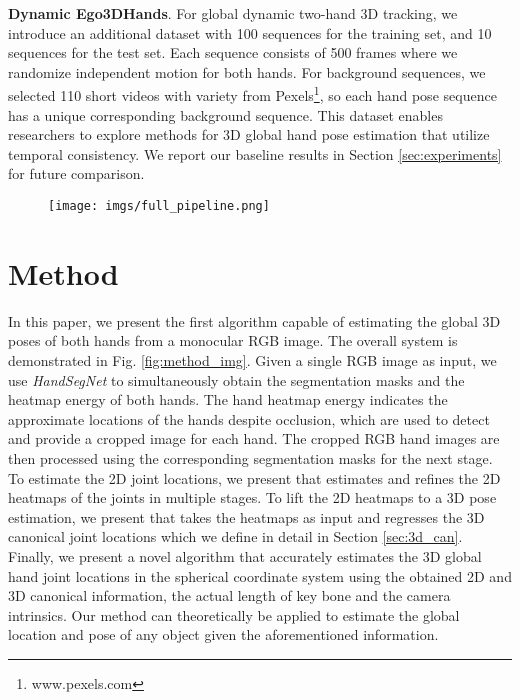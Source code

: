 \documentclass[10pt,twocolumn,letterpaper]{article}
\begin{document}
\noindent\textbf{Dynamic Ego3DHands}. For global dynamic two-hand 3D tracking, we introduce an additional dataset with 100 sequences for the training set, and 10 sequences for the test set. Each sequence consists of 500 frames where we randomize independent motion for both hands. For background sequences, we selected 110 short videos with variety from Pexels\footnote{www.pexels.com}, so each hand pose sequence has a unique corresponding background sequence. This dataset enables researchers to explore methods for 3D global hand pose estimation that utilize temporal consistency. We report our baseline results in Section \ref{sec:experiments} for future comparison.
\begin{figure*}[t!]
  \centering
  \begin{subfigure}[b]{1.0\linewidth}
    \texttt{[image: imgs/full\_pipeline.png]}
  \end{subfigure}
  \caption{Overview of proposed pipeline for two-hand global pose estimation from monocular RGB. Given a RGB image, we segment and detect the hands, crop and process the hand images for 2D canonical pose estimation despite inter-hand occlusion, and use the 2D heatmaps to estimate 3D canonical poses. For the final step, We introduce a novel algorithm for computing the 3D global hand poses using the 2D and 3D canonical estimation as well as the actual bone lengths.}
  \label{fig:method_img}
\end{figure*}
\section{Method}
\indent In this paper, we present the first algorithm capable of estimating the global 3D poses of both hands from a monocular RGB image. The overall system is demonstrated in Fig. \ref{fig:method_img}. Given a single RGB image as input, we use \textit{HandSegNet} to simultaneously obtain the segmentation masks and the heatmap energy of both hands. The hand heatmap energy indicates the approximate locations of the hands despite occlusion, which are used to detect and provide a cropped image for each hand. The cropped RGB hand images are then processed using the corresponding segmentation masks for the next stage. To estimate the 2D joint locations, we present \textit{} that estimates and refines the 2D heatmaps of the joints in multiple stages. To lift the 2D heatmaps to a 3D pose estimation, we present \textit{} that takes the heatmaps as input and regresses the 3D canonical joint locations which we define in detail in Section \ref{sec:3d_can}. Finally, we present a novel algorithm that accurately estimates the 3D global hand joint locations in the spherical coordinate system using the obtained 2D and 3D canonical information, the actual length of key bone and the camera intrinsics. Our method can theoretically be applied to estimate the global location and pose of any object given the aforementioned information.
\end{document}
